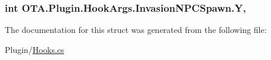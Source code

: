 \subsubsection[{Y}]{\setlength{\rightskip}{0pt plus 5cm}int O\+T\+A.\+Plugin.\+Hook\+Args.\+Invasion\+N\+P\+C\+Spawn.\+Y\hspace{0.3cm}{\ttfamily [get]}, {\ttfamily [set]}}\label{struct_o_t_a_1_1_plugin_1_1_hook_args_1_1_invasion_n_p_c_spawn_a70c8410b13bc21cf0456d2300fc21721}


The documentation for this struct was generated from the following file\+:\begin{DoxyCompactItemize}
\item 
Plugin/\hyperlink{_hooks_8cs}{Hooks.\+cs}\end{DoxyCompactItemize}
